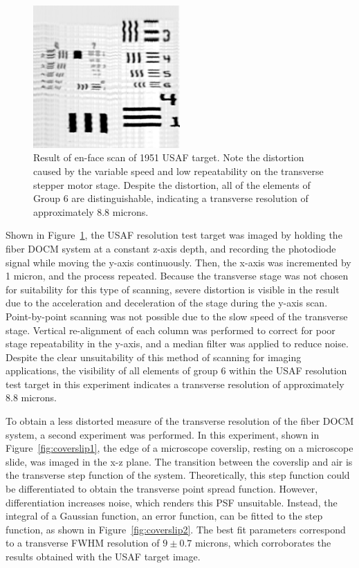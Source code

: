 \begin{figure}[h!]
\centering
\includegraphics[width=0.5\textwidth]{Images/Results/en-face-usaf.png}
\caption[Result of en-face scan of USAF target.]{Result of en-face scan of 1951 USAF target. Note the distortion caused by the variable speed and low repeatability on the transverse stepper motor stage. Despite the distortion, all of the elements of Group 6 are distinguishable, indicating a transverse resolution of approximately 8.8 microns.\label{fig:usaf_oct}}
\end{figure}

Shown in Figure~\ref{fig:usaf_oct}, the USAF resolution test target was imaged by holding the fiber DOCM system at a constant z-axis depth, and recording the photodiode signal while moving the y-axis continuously. Then, the x-axis was incremented by 1 micron, and the process repeated. Because the transverse stage was not chosen for suitability for this type of scanning, severe distortion is visible in the result due to the acceleration and deceleration of the stage during the y-axis scan. Point-by-point scanning was not possible due to the slow speed of the transverse stage. Vertical re-alignment of each column was performed to correct for poor stage repeatability in the y-axis, and a median filter was applied to reduce noise. Despite the clear unsuitability of this method of scanning for imaging applications, the visibility of all elements of group 6 within the USAF resolution test target in this experiment indicates a transverse resolution of approximately 8.8 microns.

To obtain a less distorted measure of the transverse resolution of the fiber DOCM system, a second experiment was performed. In this experiment, shown in Figure~\ref{fig:coverslip1}, the edge of a microscope coverslip, resting on a microscope slide, was imaged in the x-z plane. The transition between the coverslip and air is the transverse step function of the system. Theoretically, this step function could be differentiated to obtain the transverse point spread function. However, differentiation increases noise, which renders this PSF unsuitable. Instead, the integral of a Gaussian function, an error function, can be fitted to the step function, as shown in Figure~\ref{fig:coverslip2}. The best fit parameters correspond to a transverse FWHM resolution of $9 \pm 0.7$ microns, which corroborates the results obtained with the USAF target image.

